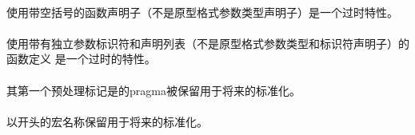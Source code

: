 \paragraph{}
使用带空括号的函数声明子（不是原型格式参数类型声明子）是一个过时特性。

\paragraph{}
使用带有独立参数标识符和声明列表（不是原型格式参数类型和标识符声明子）的函数定义
是一个过时的特性。

\paragraph{}
其第一个预处理标记是的pragma被保留用于将来的标准化。

\paragraph{}
以开头的宏名称保留用于将来的标准化。

